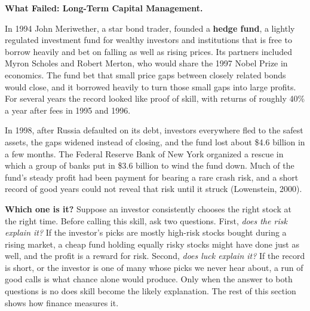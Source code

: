 \begin{callout}
\textbf{What Failed: Long-Term Capital Management.} 

In 1994 John Meriwether, a star bond trader, founded a \textbf{hedge fund}, a lightly regulated investment fund for wealthy investors and institutions that is free to borrow heavily and bet on falling as well as rising prices. Its partners included Myron Scholes and Robert Merton, who would share the 1997 Nobel Prize in economics. The fund bet that small price gaps between closely related bonds would close, and it borrowed heavily to turn those small gaps into large profits. For several years the record looked like proof of skill, with returns of roughly 40\% a year after fees in 1995 and 1996. 

In 1998, after Russia defaulted on its debt, investors everywhere fled to the safest assets, the gaps widened instead of closing, and the fund lost about \$4.6 billion in a few months. The Federal Reserve Bank of New York organized a rescue in which a group of banks put in \$3.6 billion to wind the fund down. Much of the fund's steady profit had been payment for bearing a rare crash risk, and a short record of good years could not reveal that risk until it struck (Lowenstein, 2000).
\end{callout}



\noindent\textbf{Which one is it?} Suppose an investor
consistently chooses the right stock at the right time. Before calling this
skill, ask two questions. First, \emph{does the risk explain it?} If the
investor's picks are mostly high-risk stocks bought during a rising market,
a cheap fund holding equally risky stocks might have done just as well, and
the profit is a reward for risk. Second, \emph{does luck explain it?} If the
record is short, or the investor is one of many whose picks we never hear
about, a run of good calls is what chance alone would produce. Only when the
answer to both questions is no does skill become the likely explanation. The
rest of this section shows how finance measures it.

